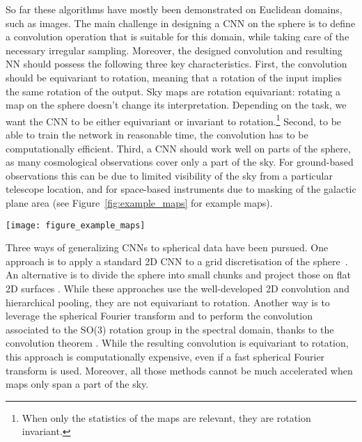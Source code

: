 \documentclass[final,twocolumn,3p,times,sort&compress]{elsarticle}
\newcommand{\figref}[1]{Figure~\ref{fig:#1}}
\newcommand{\1}{\b{1}}              %
\newcommand{\0}{\b{0}}              %
\begin{document}
So far these algorithms have mostly been demonstrated on Euclidean domains, such as images.
The main challenge in designing a CNN on the sphere is to define a convolution operation that is suitable for this domain, while taking care of the necessary irregular sampling.
Moreover, the designed convolution and resulting NN should possess the following three key characteristics.
First, the convolution should be equivariant to rotation, meaning that a rotation of the input implies the same rotation of the output.
Sky maps are rotation equivariant: rotating a map on the sphere doesn’t change its interpretation.
Depending on the task, we want the CNN to be either equivariant or invariant to rotation.\footnote{When only the statistics of the maps are relevant, they are rotation invariant.}
Second, to be able to train the network in reasonable time, the convolution has to be computationally efficient.
Third, a CNN should work well on parts of the sphere, as many cosmological observations cover only a part of the sky.
For ground-based observations this can be due to limited visibility of the sky from a particular telescope location, and for space-based instruments due to masking of the galactic plane area (see \figref{example_maps} for example maps).

\begin{figure*}
\texttt{[image: figure\_example\_maps]}
\caption{Example maps on the sphere:
(left) the CMB temperature (K) map from Planck \citep{planck2015overview}, with galactic plane masked,
(middle) map of galaxy number counts (number of galaxies per arcmin$^2$) in SDSS DR14 \citep{abolfathi2017sdssDR14},
and (right) simulated weak lensing convergence map (dimensionless) simulated with DES DR1 mask \citep{des2018dr1}.
These maps were pixelised using $N_{side} = 512$.
The CMB and weak lensing mass maps were smoothed with Gaussian kernels with FWHM=1 deg, and the galaxy count map with FWHM=0.5 deg.
}
\label{fig:example_maps}
\end{figure*}

Three ways of generalizing CNNs to spherical data have been pursued.
One approach is to apply a standard 2D CNN to a grid discretisation of the sphere~\citep{boomsma2017spherical,su2017sphericalconv,coors2018spherenet}.
An alternative is to divide the sphere into small chunks and project those on flat 2D surfaces \citep{fluri2018deep,gupta2018nongaussianinformation,schmelze2017cosmologicalmodel,gillet2018deeplearning}.
While these approaches use the well-developed 2D convolution and hierarchical pooling, they are not equivariant to rotation.
Another way is to leverage the spherical Fourier transform and to perform the convolution associated to the SO(3) rotation group in the spectral domain, thanks to the convolution theorem \citep{cohen2018sphericalcnn, esteves2017sphericalcnn}.
While the resulting convolution is equivariant to rotation, this approach is computationally expensive, even if a fast spherical Fourier transform is used.
Moreover, all those methods cannot be much accelerated when maps only span a part of the sky.
\end{document}
